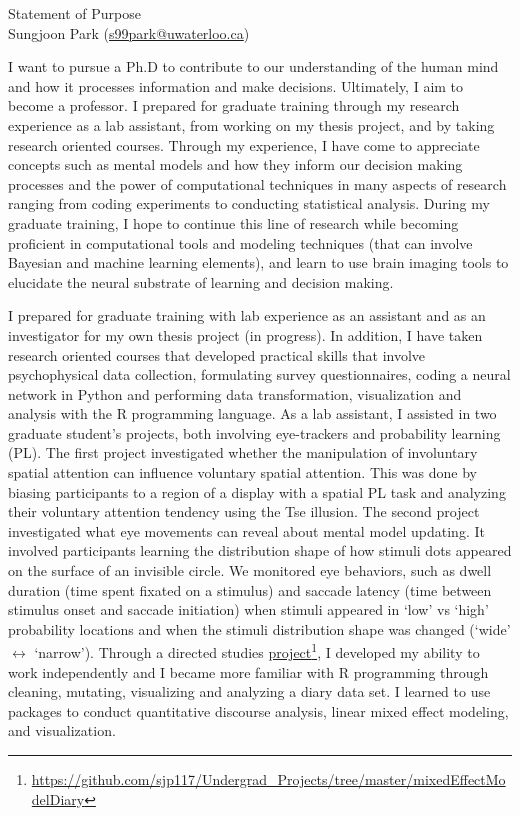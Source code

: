\documentclass[12pt]{article}
\let\oldcenter\center
\let\oldendcenter\endcenter
\renewenvironment{center}{\setlength\topsep{-1pt}\oldcenter}{\oldendcenter}
\begin{document}
	
	\begin{center}
		{\Large Statement of Purpose} \\
		{\normalsize Sungjoon Park (\href{mailto:s99park@uwaterloo.ca}{s99park@uwaterloo.ca})}
	\end{center}
	
	I want to pursue a Ph.D to contribute to our understanding of the human mind and how it processes information and make decisions. Ultimately, I aim to become a professor. I prepared for graduate training through my research experience as a lab assistant, from working on my thesis project, and by taking research oriented courses. Through my experience, I have come to appreciate concepts such as mental models and how they inform our decision making processes and the power of computational techniques in many aspects of research ranging from coding experiments to conducting statistical analysis. During my graduate training, I hope to continue this line of research while becoming proficient in computational tools and modeling techniques (that can involve Bayesian and machine learning elements), and learn to use brain imaging tools to elucidate the neural substrate of learning and decision making.

	I prepared for graduate training with lab experience as an assistant and as an investigator for my own thesis project (in progress). In addition, I have taken research oriented courses that developed practical skills that involve psychophysical data collection, formulating survey questionnaires, coding a neural network in Python and performing data transformation, visualization and analysis with the R programming language. As a lab assistant, I assisted in two graduate student's projects, both involving eye-trackers and probability learning (PL). The first project investigated whether the manipulation of involuntary spatial attention can influence voluntary spatial attention. This was done by biasing participants to a region of a display with a spatial PL task and analyzing their voluntary attention tendency using the Tse illusion. The second project investigated what eye movements can reveal about mental model updating. It involved participants learning the distribution shape of how stimuli dots appeared on the surface of an invisible circle. We monitored eye behaviors, such as dwell duration (time spent fixated on a stimulus) and saccade latency (time between stimulus onset and saccade initiation) when stimuli appeared in `low' vs `high' probability locations and when the stimuli distribution shape was changed (`wide' $\leftrightarrow$ `narrow'). Through a directed studies \href{https://github.com/sjp117/Undergrad_Projects/tree/master/mixedEffectModelDiary}{project}\footnote{\url{https://github.com/sjp117/Undergrad\_Projects/tree/master/mixedEffectModelDiary}}, I developed my ability to work independently and I became more familiar with R programming through cleaning, mutating, visualizing and analyzing a diary data set. I learned to use packages to conduct quantitative discourse analysis, linear mixed effect modeling, and visualization.
\end{document}
